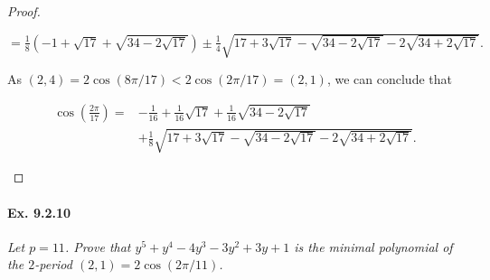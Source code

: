 \documentclass[11pt,a4paper]{article}
\begin{document}
\begin{proof}
\begin{enumerate}
$=\frac{1}{8} \left(-1+\sqrt{17} +\sqrt{34-2\sqrt{17}}\right) \pm \frac{1}{4} \sqrt{17 + 3\sqrt{17} - \sqrt{34-2\sqrt{17}}  -2 \sqrt{34+2\sqrt{17}} }.$

As $(2,4) = 2\cos(8\pi/17) < 2 \cos(2\pi/17) = (2,1)$, we can conclude that

 \begin{align*}
\cos\left(\frac{2\pi}{17}\right) =&-\frac{1}{16}+ \frac{1}{16}\sqrt{17} +\frac{1}{16}\sqrt{34-2\sqrt{17}}\\
 & + \frac{1}{8} \sqrt{17 + 3\sqrt{17} - \sqrt{34-2\sqrt{17}}  -2 \sqrt{34+2\sqrt{17}} }.
 \end{align*}
 
\end{enumerate}
\end{proof}

\paragraph{Ex. 9.2.10}

{\it Let $p=11$. Prove that $y^5+y^4-4y^3-3y^2+3y+1$ is the minimal polynomial of the $2$-period $(2,1)=2\cos(2\pi/11)$.
}
\end{document}
